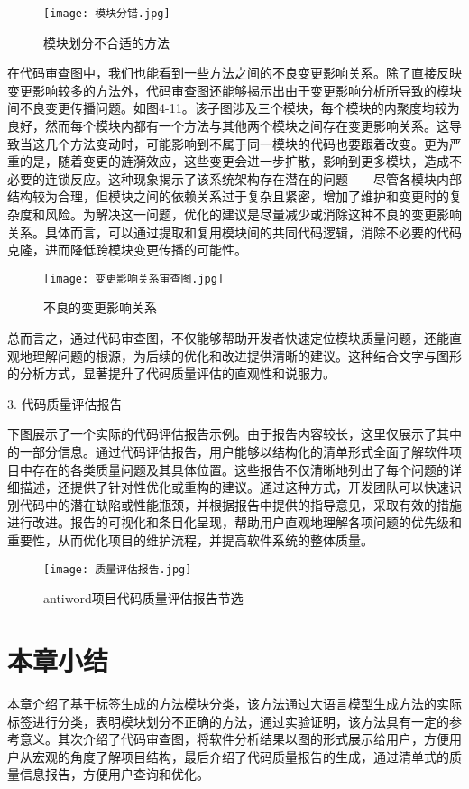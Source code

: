 \begin{figure}[h]
\centering
\texttt{[image: 模块分错.jpg]}
\caption{模块划分不合适的方法}
\end{figure}


在代码审查图中，我们也能看到一些方法之间的不良变更影响关系。除了直接反映变更影响较多的方法外，代码审查图还能够揭示出由于变更影响分析所导致的模块间不良变更传播问题。如图4-11。该子图涉及三个模块，每个模块的内聚度均较为良好，然而每个模块内都有一个方法与其他两个模块之间存在变更影响关系。这导致当这几个方法变动时，可能影响到不属于同一模块的代码也要跟着改变。更为严重的是，随着变更的涟漪效应，这些变更会进一步扩散，影响到更多模块，造成不必要的连锁反应。这种现象揭示了该系统架构存在潜在的问题——尽管各模块内部结构较为合理，但模块之间的依赖关系过于复杂且紧密，增加了维护和变更时的复杂度和风险。为解决这一问题，优化的建议是尽量减少或消除这种不良的变更影响关系。具体而言，可以通过提取和复用模块间的共同代码逻辑，消除不必要的代码克隆，进而降低跨模块变更传播的可能性。


\begin{figure}[h]
\centering
\texttt{[image: 变更影响关系审查图.jpg]}
\caption{不良的变更影响关系}
\end{figure}


总而言之，通过代码审查图，不仅能够帮助开发者快速定位模块质量问题，还能直观地理解问题的根源，为后续的优化和改进提供清晰的建议。这种结合文字与图形的分析方式，显著提升了代码质量评估的直观性和说服力。

3. 代码质量评估报告

下图展示了一个实际的代码评估报告示例。由于报告内容较长，这里仅展示了其中的一部分信息。通过代码评估报告，用户能够以结构化的清单形式全面了解软件项目中存在的各类质量问题及其具体位置。这些报告不仅清晰地列出了每个问题的详细描述，还提供了针对性优化或重构的建议。通过这种方式，开发团队可以快速识别代码中的潜在缺陷或性能瓶颈，并根据报告中提供的指导意见，采取有效的措施进行改进。报告的可视化和条目化呈现，帮助用户直观地理解各项问题的优先级和重要性，从而优化项目的维护流程，并提高软件系统的整体质量。

\clearpage

\begin{figure}[h]
\centering
\texttt{[image: 质量评估报告.jpg]}
\caption{antiword项目代码质量评估报告节选}
\end{figure}



\section{本章小结}

本章介绍了基于标签生成的方法模块分类，该方法通过大语言模型生成方法的实际标签进行分类，表明模块划分不正确的方法，通过实验证明，该方法具有一定的参考意义。其次介绍了代码审查图，将软件分析结果以图的形式展示给用户，方便用户从宏观的角度了解项目结构，最后介绍了代码质量报告的生成，通过清单式的质量信息报告，方便用户查询和优化。






